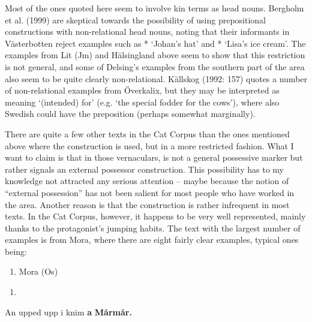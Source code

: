 Most of the ones quoted here seem to involve kin terms as head nouns. Bergholm et al. (1999) are skeptical towards the possibility of using prepositional constructions with non-relational head nouns, noting that their informants in Västerbotten reject examples such as * ‘Johan’s hat’ and * ‘Lisa’s ice cream’. The examples from Lit (Jm) and Hälsingland above seem to show that this restriction is not general, and some of Delsing’s examples from the southern part of the area also seem to be quite clearly non-relational. Källskog (1992: 157) quotes a number of non-relational examples from Överkalix, but they may be interpreted as meaning ‘(intended) for’ (e.g.  ‘the special fodder for the cows’), where also Swedish could have the preposition  (perhaps somewhat marginally). 

There are quite a few other texts in the Cat Corpus than the ones mentioned above where the construction is used, but in a more restricted fashion. What I want to claim is that in those vernaculars, is not a general possessive marker but rather signals an external possessor construction. This possibility has to my knowledge not attracted any serious attention – maybe because the notion of “external possession” has not been salient for most people who have worked in the area. Another reason is that the construction is rather infrequent in most texts. In the Cat Corpus, however, it happens to be very well represented, mainly thanks to the protagonist’s jumping habits. The text with the largest number of examples is from Mora, where there are eight fairly clear examples, typical ones being:

\begin{enumerate} %
\item 
\label{bkm:Ref137369958}Mora (Os)

\end{enumerate} %
\setcounter{listLFOxcviiileveli}{0}
\begin{enumerate} %
\item 
\end{enumerate} %
\ea\label{}
\gll An  upped  upp  i  knim  \textbf{a} \textbf{Mårmår.}\\


